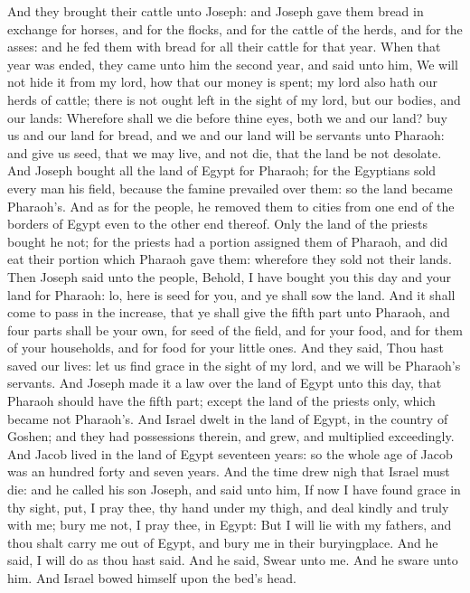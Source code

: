 \begin{biblechapter}
\verse And they brought their cattle unto Joseph: and Joseph gave them bread in exchange for horses, and for the flocks, and for the cattle of the herds, and for the asses: and he fed them with bread for all their cattle for that year.
\verse When that year was ended, they came unto him the second year, and said unto him, We will not hide it from my lord, how that our money is spent; my lord also hath our herds of cattle; there is not ought left in the sight of my lord, but our bodies, and our lands:
\verse Wherefore shall we die before thine eyes, both we and our land? buy us and our land for bread, and we and our land will be servants unto Pharaoh: and give us seed, that we may live, and not die, that the land be not desolate.
\verse And Joseph bought all the land of Egypt for Pharaoh; for the Egyptians sold every man his field, because the famine prevailed over them: so the land became Pharaoh's.
\verse And as for the people, he removed them to cities from one end of the borders of Egypt even to the other end thereof.
\verse Only the land of the priests bought he not; for the priests had a portion assigned them of Pharaoh, and did eat their portion which Pharaoh gave them: wherefore they sold not their lands.
\verse Then Joseph said unto the people, Behold, I have bought you this day and your land for Pharaoh: lo, here is seed for you, and ye shall sow the land.
\verse And it shall come to pass in the increase, that ye shall give the fifth part unto Pharaoh, and four parts shall be your own, for seed of the field, and for your food, and for them of your households, and for food for your little ones.
\verse And they said, Thou hast saved our lives: let us find grace in the sight of my lord, and we will be Pharaoh's servants.
\verse And Joseph made it a law over the land of Egypt unto this day, that Pharaoh should have the fifth part; except the land of the priests only, which became not Pharaoh's.
\verse And Israel dwelt in the land of Egypt, in the country of Goshen; and they had possessions therein, and grew, and multiplied exceedingly.
\verse And Jacob lived in the land of Egypt seventeen years: so the whole age of Jacob was an hundred forty and seven years.
\verse And the time drew nigh that Israel must die: and he called his son Joseph, and said unto him, If now I have found grace in thy sight, put, I pray thee, thy hand under my thigh, and deal kindly and truly with me; bury me not, I pray thee, in Egypt:
\verse But I will lie with my fathers, and thou shalt carry me out of Egypt, and bury me in their buryingplace. And he said, I will do as thou hast said.
\verse And he said, Swear unto me. And he sware unto him. And Israel bowed himself upon the bed's head.
\end{biblechapter}

